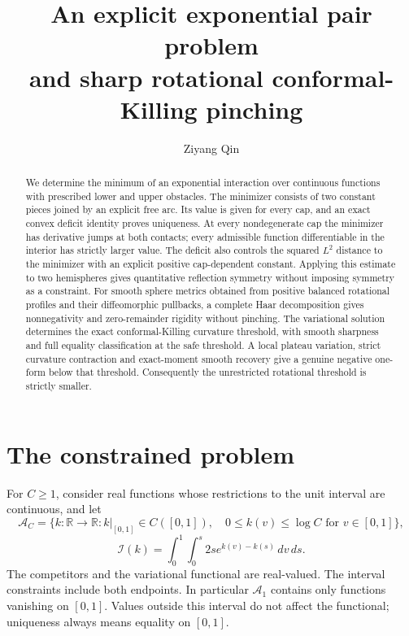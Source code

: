 \documentclass[11pt]{article}
\title{An explicit exponential pair problem\\and sharp rotational conformal-Killing pinching}
\author{Ziyang Qin}
\date{}
\newcommand{\I}{\mathcal I}
\newcommand{\R}{\mathbb R}
\begin{document}
\maketitle

\begin{abstract}
We determine the minimum of an exponential interaction over continuous
functions with prescribed lower and upper obstacles. The minimizer consists
of two constant pieces joined by an explicit free arc. Its value is given
for every cap, and an exact convex deficit identity proves uniqueness.
At every nondegenerate cap the minimizer has derivative jumps at both
contacts; every admissible function differentiable in the interior has
strictly larger value.
The deficit also controls the squared $L^2$ distance to the minimizer with
an explicit positive cap-dependent constant. Applying this estimate to two
hemispheres gives quantitative reflection symmetry without imposing symmetry
as a constraint.
For smooth sphere metrics obtained from positive balanced rotational profiles
and their diffeomorphic pullbacks, a complete Haar decomposition gives
nonnegativity and zero-remainder rigidity without pinching.
The variational solution determines the exact conformal-Killing curvature
threshold, with smooth sharpness and full equality classification at the safe threshold.
A local plateau variation, strict curvature contraction and exact-moment
smooth recovery give a genuine negative one-form below that threshold.
Consequently the unrestricted rotational threshold is strictly smaller.
\end{abstract}

\section{The constrained problem}

For $C\geq1$, consider real functions whose restrictions to the unit interval
are continuous, and let
\[
 \mathcal A_C=\{k:\R\to\R:k|_{[0,1]}\in C([0,1]),\quad
      0\leq k(v)\leq\log C\text{ for }v\in[0,1]\},
\]
\[
 \I(k)=\int_0^1\int_0^s 2s e^{k(v)-k(s)}\,dv\,ds.
\]
The competitors and the variational functional are real-valued. The interval
constraints include both endpoints. In particular $\mathcal A_1$ contains
only functions vanishing on $[0,1]$. Values outside this interval do not
affect the functional; uniqueness always means equality on $[0,1]$.
\end{document}
